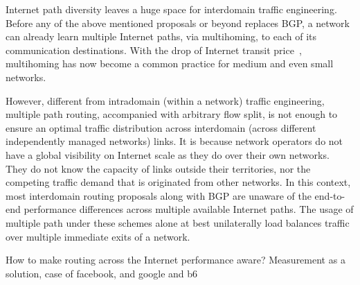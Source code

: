 
Internet path diversity leaves a huge space for interdomain traffic engineering. Before any of the above mentioned proposals or beyond replaces \acf{BGP}, a network can already learn multiple Internet paths, via multihoming, to each of its communication destinations.
With the drop of Internet transit price~\cite{transitprice}, multihoming has now become a common practice for medium and even small networks.

However, different from intradomain (within a network) traffic engineering, multiple path routing, accompanied with arbitrary flow split, is not enough to ensure an optimal traffic distribution across interdomain (across different independently managed networks) links.
It is because network operators do not have a global visibility on Internet scale as they do over their own networks.
They do not know the capacity of links outside their territories, nor the competing traffic demand that is originated from other networks.
In this context, most interdomain routing proposals along with \acf{BGP} are unaware of the end-to-end performance differences across multiple available Internet paths. The usage of multiple path under these schemes alone at best unilaterally load balances traffic over multiple immediate exits of a network.


How to make routing across the Internet performance aware?
Measurement as a solution, case of facebook, and google and b6


